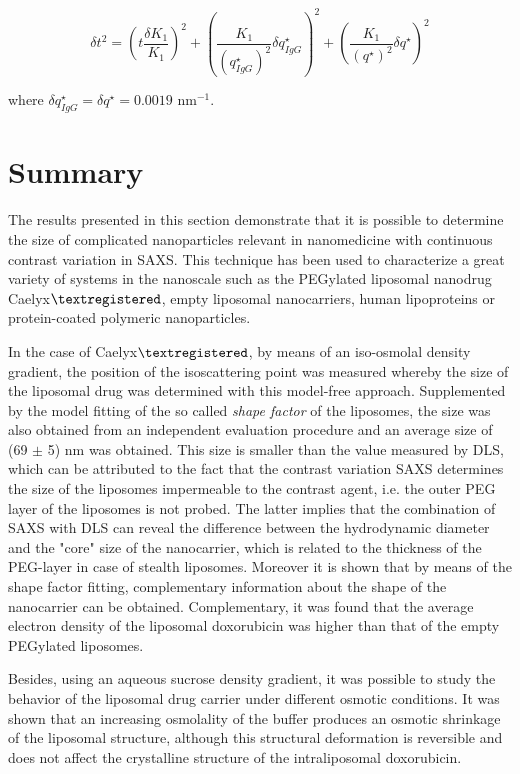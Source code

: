 \begin{equation}
\delta t^2 = \left( t \frac{\delta K_1}{K_1} \right)^2 + \left( \frac{K_1}{\left(q^{\star}_{IgG}\right)^2} \delta q^{\star}_{IgG} \right)^2 + \left( \frac{K_1}{\left(q^{\star}\right)^2} \delta q^{\star}\right)^2
\label{eq:IsopointRadiusDifference}
\end{equation}

where $\delta q^{\star}_{IgG}=\delta q^{\star}=0.0019$ nm$^{-1}$.

\section{Summary}
The results presented in this section demonstrate that it is possible to determine the size of complicated nanoparticles relevant in nanomedicine with continuous contrast variation in SAXS. This technique has been used to characterize a great variety of systems in the nanoscale such as the PEGylated liposomal nanodrug Caelyx$\textregistered$, empty liposomal nanocarriers, human lipoproteins or protein-coated polymeric nanoparticles.

In the case of Caelyx$\textregistered$, by means of an iso-osmolal density gradient, the position of the isoscattering point was measured whereby the size of the liposomal drug was determined with this model-free approach. Supplemented by the model fitting of the so called \emph{shape factor} of the liposomes, the size was also obtained from an independent evaluation procedure and an average size of (69 $\pm$ 5) nm was obtained. This size is smaller than the value measured by DLS, which can be attributed to the fact that the contrast variation SAXS determines the size of the liposomes impermeable to the contrast agent, i.e. the outer PEG layer of the liposomes is not probed. The latter implies that the combination of SAXS with DLS can reveal the difference between the hydrodynamic diameter and the "core" size of the nanocarrier, which is related to the thickness of the PEG-layer in case of stealth liposomes. Moreover it is shown that by means of the shape factor fitting, complementary information about the shape of the nanocarrier can be obtained. Complementary, it was found that the average electron density of the liposomal doxorubicin was higher than that of the empty PEGylated liposomes.

Besides, using an aqueous sucrose density gradient, it was possible to study the behavior of the liposomal drug carrier under different osmotic conditions. It was shown that an increasing osmolality of the buffer produces an osmotic shrinkage of the liposomal structure, although this structural deformation is reversible and does not affect the crystalline structure of the intraliposomal doxorubicin.

